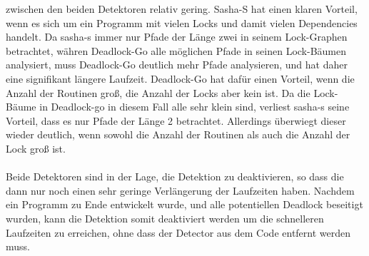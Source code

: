 zwischen den beiden Detektoren relativ gering. Sasha-S hat einen klaren 
Vorteil, wenn es sich um ein Programm mit vielen Locks und damit vielen 
Dependencies handelt. Da sasha-s immer nur Pfade der Länge zwei in seinem 
Lock-Graphen betrachtet, 
währen Deadlock-Go alle möglichen Pfade in seinen Lock-Bäumen analysiert, 
muss Deadlock-Go deutlich mehr Pfade analysieren, und hat daher eine signifikant
längere Laufzeit. Deadlock-Go hat dafür einen Vorteil, wenn die Anzahl der 
Routinen groß, die Anzahl der Locks aber kein ist. Da die Lock-Bäume in Deadlock-go
in diesem Fall alle sehr klein sind, verliest sasha-s seine Vorteil, dass 
es nur Pfade der Länge 2 betrachtet. Allerdings überwiegt dieser wieder 
deutlich, wenn sowohl die Anzahl der Routinen als auch die Anzahl der Lock groß
ist.\\ \\
Beide Detektoren sind in der Lage, die Detektion zu deaktivieren, so dass die dann nur noch einen
sehr geringe Verlängerung der Laufzeiten haben. Nachdem ein Programm zu Ende entwickelt
wurde, und alle potentiellen Deadlock beseitigt wurden, kann die Detektion somit deaktiviert
werden um die schnelleren Laufzeiten zu erreichen, ohne dass der Detector aus dem Code entfernt
werden muss.